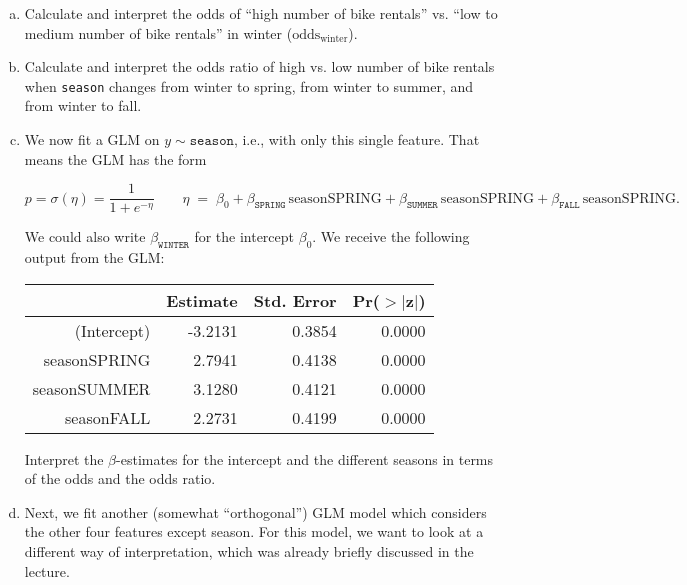 {\vspace{-0.3cm}
\begin{enumerate}[a)]

	\item
    Calculate and interpret the odds of ``high number of bike rentals'' vs. ``low to medium number of bike rentals'' in winter ($\text{odds}_{\text{winter}}$).
    
	\item
    Calculate and interpret the odds ratio of high vs. low number of bike rentals when \texttt{season} changes from winter to spring, from winter to summer, and from winter to fall.
    
	\item\label{ex:logreg_GLM_single_feature}
    We now fit a GLM on $y \sim \texttt{season}$, i.e., with only this single feature.
    That means the GLM has the form

    \[
    p=\sigma(\eta)=\frac{1}{1+e^{-\eta}}
    \qquad
    \eta \;=\;
    \beta_0
    + \beta_{\texttt{SPRING}} \,\text{seasonSPRING}
    + \beta_{\texttt{SUMMER}} \,\text{seasonSPRING}
    + \beta_{\texttt{FALL}} \,\text{seasonSPRING}.
    \]

    We could also write \(\beta_{\texttt{WINTER}}\) for the intercept \(\beta_0\).
    We receive the following output from the GLM:
    
	\begin{table}[H]
		\centering
		\begin{tabular}{rrrr}
			\hline
			& Estimate & Std. Error & Pr($>$$|$z$|$) \\ 
			\hline
			(Intercept) & -3.2131 & 0.3854 & 0.0000 \\ 
			seasonSPRING & 2.7941 & 0.4138 & 0.0000 \\ 
			seasonSUMMER & 3.1280 & 0.4121 & 0.0000 \\ 
			seasonFALL & 2.2731 & 0.4199 & 0.0000 \\ 
			\hline
		\end{tabular}
	\end{table}

	Interpret the $\beta$-estimates for the intercept and the different seasons in terms of the odds and the odds ratio. 

    \item\label{ex:logreg_GLM_more_features}
    Next, we fit another (somewhat ``orthogonal'') GLM model which considers the other four features except season.
    For this model, we want to look at a different way of interpretation, which was already briefly discussed in the lecture.
    

\end{enumerate}}
